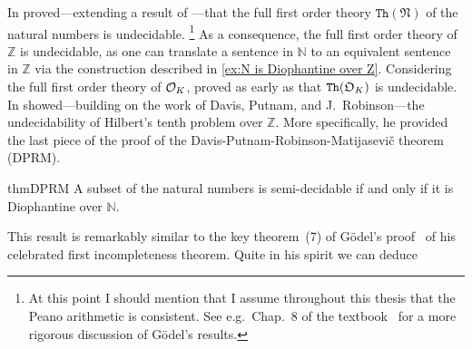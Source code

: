 In \citeyear{Rosser1936} \textcite{Rosser1936} proved---extending a result of
\textcite{Goedel1931}---that the full first order theory
\(\mathtt{Th}(\mathfrak{N})\) of the natural numbers is undecidable.%
\footnote{At this point I should mention that I assume throughout this thesis
that the Peano arithmetic is consistent. See e.g.\ Chap.~8 of the
textbook~\cite{Cooper2004} for a more rigorous discussion of Gödel's results.}
As a consequence, the full first order theory of \(ℤ\) is undecidable, as one
can translate a sentence in \(ℕ\) to an equivalent sentence in \(ℤ\) via the
construction described in \cref{ex:N is Diophantine over Z}. Considering the
full first order theory of \(\mathcal{O}_{K}\), \textcite{Robinson1959} proved as early
as \citeyear{Robinson1959} that \(\mathtt{Th}(\mathfrak{O}_{K})\) is undecidable. In
\citeyear{Matijasevic1970} \textcite{Matijasevic1970} showed---building on the
work of Davis, Putnam, and J.~Robinson---the undecidability of Hilbert's tenth
problem over \(ℤ\). More specifically, he provided the last piece of the proof
of the Davis-Putnam-Robinson-Matijasevič theorem (\textsc{DPRM}).

\begin{restatable}{thm}{DPRM}\label{thm:DPRM}
  A subset of the natural numbers is semi-decidable if and only if it is
  Diophantine over \(ℕ\).
\end{restatable}

This result is remarkably similar to the key theorem~(7) of Gödel's
proof~\cite{Goedel1931} of his celebrated first incompleteness theorem. Quite in
his spirit \cite[cf.][Thm.~9]{Goedel1931} we can deduce

